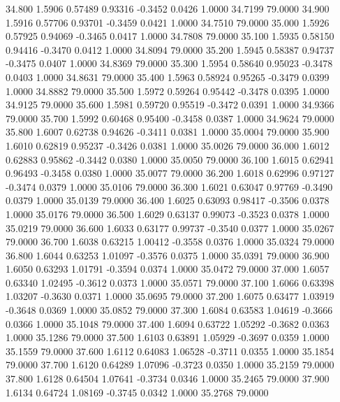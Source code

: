  34.800   1.5906   0.57489   0.93316  -0.3452   0.0426   1.0000  34.7199  79.0000
  34.900   1.5916   0.57706   0.93701  -0.3459   0.0421   1.0000  34.7510  79.0000
  35.000   1.5926   0.57925   0.94069  -0.3465   0.0417   1.0000  34.7808  79.0000
  35.100   1.5935   0.58150   0.94416  -0.3470   0.0412   1.0000  34.8094  79.0000
  35.200   1.5945   0.58387   0.94737  -0.3475   0.0407   1.0000  34.8369  79.0000
  35.300   1.5954   0.58640   0.95023  -0.3478   0.0403   1.0000  34.8631  79.0000
  35.400   1.5963   0.58924   0.95265  -0.3479   0.0399   1.0000  34.8882  79.0000
  35.500   1.5972   0.59264   0.95442  -0.3478   0.0395   1.0000  34.9125  79.0000
  35.600   1.5981   0.59720   0.95519  -0.3472   0.0391   1.0000  34.9366  79.0000
  35.700   1.5992   0.60468   0.95400  -0.3458   0.0387   1.0000  34.9624  79.0000
  35.800   1.6007   0.62738   0.94626  -0.3411   0.0381   1.0000  35.0004  79.0000
  35.900   1.6010   0.62819   0.95237  -0.3426   0.0381   1.0000  35.0026  79.0000
  36.000   1.6012   0.62883   0.95862  -0.3442   0.0380   1.0000  35.0050  79.0000
  36.100   1.6015   0.62941   0.96493  -0.3458   0.0380   1.0000  35.0077  79.0000
  36.200   1.6018   0.62996   0.97127  -0.3474   0.0379   1.0000  35.0106  79.0000
  36.300   1.6021   0.63047   0.97769  -0.3490   0.0379   1.0000  35.0139  79.0000
  36.400   1.6025   0.63093   0.98417  -0.3506   0.0378   1.0000  35.0176  79.0000
  36.500   1.6029   0.63137   0.99073  -0.3523   0.0378   1.0000  35.0219  79.0000
  36.600   1.6033   0.63177   0.99737  -0.3540   0.0377   1.0000  35.0267  79.0000
  36.700   1.6038   0.63215   1.00412  -0.3558   0.0376   1.0000  35.0324  79.0000
  36.800   1.6044   0.63253   1.01097  -0.3576   0.0375   1.0000  35.0391  79.0000
  36.900   1.6050   0.63293   1.01791  -0.3594   0.0374   1.0000  35.0472  79.0000
  37.000   1.6057   0.63340   1.02495  -0.3612   0.0373   1.0000  35.0571  79.0000
  37.100   1.6066   0.63398   1.03207  -0.3630   0.0371   1.0000  35.0695  79.0000
  37.200   1.6075   0.63477   1.03919  -0.3648   0.0369   1.0000  35.0852  79.0000
  37.300   1.6084   0.63583   1.04619  -0.3666   0.0366   1.0000  35.1048  79.0000
  37.400   1.6094   0.63722   1.05292  -0.3682   0.0363   1.0000  35.1286  79.0000
  37.500   1.6103   0.63891   1.05929  -0.3697   0.0359   1.0000  35.1559  79.0000
  37.600   1.6112   0.64083   1.06528  -0.3711   0.0355   1.0000  35.1854  79.0000
  37.700   1.6120   0.64289   1.07096  -0.3723   0.0350   1.0000  35.2159  79.0000
  37.800   1.6128   0.64504   1.07641  -0.3734   0.0346   1.0000  35.2465  79.0000
  37.900   1.6134   0.64724   1.08169  -0.3745   0.0342   1.0000  35.2768  79.0000
